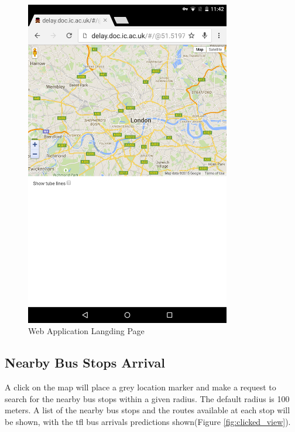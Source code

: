 \begin{figure}
\centering
\includegraphics[width=0.8\textwidth]{figures/landing_page.png}
\caption{\label{fig:landing_page} Web Application Langding Page}
\end{figure}

\subsection{Nearby Bus Stops Arrival}
\par A click on the map will place a grey location marker and make a request to search for the nearby bus stops within a given radius. The default radius is 100 meters. A list of the nearby bus stops and the routes available at each stop will be shown, with the \acrshort{tfl} bus arrivals predictions shown(Figure \ref{fig:clicked_view}).

